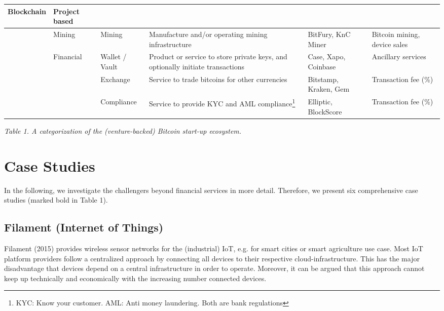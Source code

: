 {\begin{tabular}{|>{\raggedright}p{17pt}|>{\raggedright}p{46pt}|>{\raggedright}p{68pt}|>{\raggedright}p{115pt}|>{\raggedright}p{53pt}|>{\raggedright}p{85pt}|}
Blockchain & Project based\tabularnewline
\hline
 & Mining & Mining & Manufacture and/or operating mining infrastructure & BitFury, 
KnC Miner & Bitcoin mining, device sales\tabularnewline
\hline
 & Financial & Wallet / Vault & Product or service to store private keys, and optionally 
initiate transactions & Case, Xapo, Coinbase & Ancillary services\tabularnewline
\hline
 &  & Exchange & Service to trade bitcoins for other currencies & Bitstamp, Kraken, 
Gem & Transaction fee (\%)\tabularnewline
\hline
 &  & Compliance & Service to provide KYC and AML compliance\footnote{ KYC: Know 
your customer. AML: Anti money laundering. Both are bank regulations} & Elliptic, 
BlockScore & Transaction fee (\%)\tabularnewline
\hline
\end{tabular}}

\textit{Table 1.  A categorization of the (venture-backed) Bitcoin start-up ecosystem.}

\section{Case Studies}


In the following, we investigate the challengers beyond financial services in more 
detail. Therefore, we present six comprehensive case studies (marked bold in Table 
1).

\subsection{Filament (Internet of Things)}
\label{sec:ecofilament}

Filament (2015) provides wireless sensor networks for the (industrial) IoT, e.g. 
for smart cities or smart agriculture use case. Most IoT platform providers follow 
a centralized approach by connecting all devices to their respective cloud-infrastructure. 
This has the major disadvantage that devices depend on a central infrastructure 
in order to operate. Moreover, it can be argued that this approach cannot keep 
up technically and economically with the increasing number connected devices.

